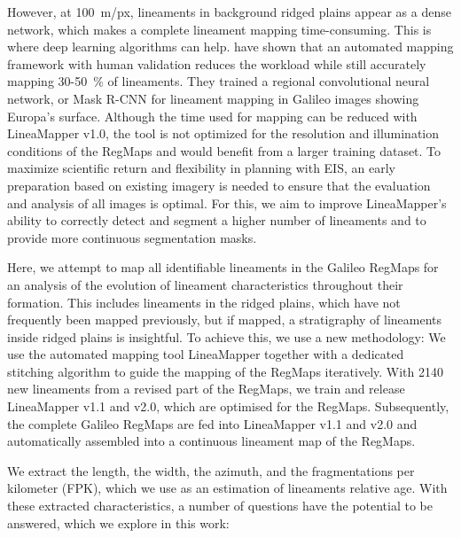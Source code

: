 However, at 100~m/px, lineaments in background ridged plains appear as a dense network, which makes a complete lineament mapping time-consuming. This is where deep learning algorithms can help.  have shown that an automated mapping framework with human validation reduces the workload while still accurately mapping 30-50~\% of lineaments. They trained a regional convolutional neural network, or Mask R-CNN for lineament mapping in Galileo images showing Europa's surface. Although the time used for mapping can be reduced with LineaMapper v1.0, the tool is not optimized for the resolution and illumination conditions of the RegMaps and would benefit from a larger training dataset. 
To maximize scientific return and flexibility in planning with EIS, an early preparation based on existing imagery is needed to ensure that the evaluation and analysis of all images is optimal. For this, we aim to improve LineaMapper's ability to correctly detect and segment a higher number of lineaments and to provide more continuous segmentation masks.


Here, we attempt to map all identifiable lineaments in the Galileo RegMaps for an analysis of the evolution of lineament characteristics throughout their formation. This includes lineaments in the ridged plains, which have not frequently been mapped previously, but if mapped, a stratigraphy of lineaments inside ridged plains is insightful.
To achieve this, we use a new methodology: We use the automated mapping tool LineaMapper together with a dedicated stitching algorithm to guide the mapping of the RegMaps iteratively. With 2140 new lineaments from a revised part of the RegMaps, we train and release LineaMapper v1.1 and v2.0, which are optimised for the RegMaps. Subsequently, the complete Galileo RegMaps are fed into LineaMapper v1.1 and v2.0 and automatically assembled into a continuous lineament map of the RegMaps.

We extract the length, the width, the azimuth, and the fragmentations per kilometer (FPK), which we use as an estimation of lineaments relative age. With these extracted characteristics, a number of questions have the potential to be answered, which we explore in this work: 

